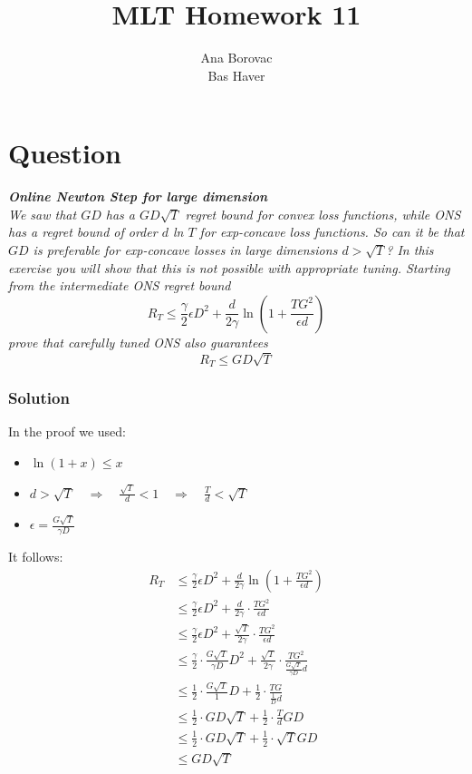 \documentclass{article}
\title{MLT Homework 11}
\author{Ana Borovac  \\ Bas Haver}
\newcounter{counterquestion}
\newenvironment{question}[1]
{
\stepcounter{counterquestion}
\section*{Question \thecounterquestion}
\emph{#1} 
} 
{
}
\newenvironment{solution}
{
\subsubsection*{Solution}
} 
{
}
\begin{document}
\maketitle

\begin{question}{\textbf{Online Newton Step for large dimension} \\ We saw that $GD$ has a $GD\sqrt{T}$ regret bound for convex loss functions, while ONS has a regret bound of order $d$ ln $T$ for exp-concave loss functions. So can it be that $GD$ is preferable for exp-concave losses in large dimensions $d > \sqrt{T}$? In this exercise you will show that this is not possible with appropriate tuning. Starting from the intermediate ONS regret bound
\[
R_T \leq \frac{\gamma}{2} \epsilon D^2 + \frac{d}{2 \gamma} \ln \left( 1 + \frac{TG^2}{\epsilon d} \right)
\]
prove that carefully tuned ONS also guarantees
\[
R_T \leq GD\sqrt{T}
\]}
\begin{solution}
In the proof we used:
\begin{itemize}
\item $\ln (1 + x) \leq x$
\item $d > \sqrt{T} \quad \Rightarrow \quad \frac{\sqrt{T}}{d} < 1 \quad \Rightarrow \quad \frac{T}{d} < \sqrt{T}$
\item $\epsilon = \frac{G \sqrt{T}}{\gamma D}$
\end{itemize}
It follows:
\begin{align*}
R_T & \leq \frac{\gamma}{2} \epsilon D^2 + \frac{d}{2 \gamma} \ln \left( 1 + \frac{TG^2}{\epsilon d} \right) \\
& \leq \frac{\gamma}{2} \epsilon D^2 + \frac{d}{2 \gamma} \cdot \frac{TG^2}{\epsilon d} \\
& \leq \frac{\gamma}{2} \epsilon D^2 + \frac{\sqrt{T}}{2 \gamma} \cdot \frac{TG^2}{\epsilon d} \\
& \leq \frac{\gamma}{2} \cdot \frac{G \sqrt{T}}{\gamma D} D^2 + \frac{\sqrt{T}}{2 \gamma} \cdot \frac{TG^2}{\frac{G \sqrt{T}}{\gamma D} d} \\
& \leq \frac{1}{2} \cdot \frac{G \sqrt{T}}{1} D + \frac{1}{2} \cdot \frac{TG}{\frac{1}{D} d} \\
& \leq \frac{1}{2} \cdot GD\sqrt{T} + \frac{1}{2} \cdot \frac{T}{d} GD \\
& \leq \frac{1}{2} \cdot GD\sqrt{T} + \frac{1}{2} \cdot \sqrt{T} GD \\
& \leq GD\sqrt{T} \\
\end{align*}
\end{solution}
\end{question}
\end{document}
